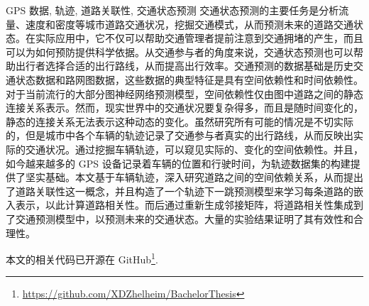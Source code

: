 \begin{中文摘要}{GPS 数据, 轨迹, 道路关联性, 交通状态预测}
  交通状态预测的主要任务是分析流量、速度和密度等城市道路交通状况，挖掘交通模式，从而预测未来的道路交通状态。在实际应用中，它不仅可以帮助交通管理者提前注意到交通拥堵的产生，而且可以为如何预防提供科学依据。从交通参与者的角度来说，交通状态预测也可以帮助出行者选择合适的出行路线，从而提高出行效率。交通预测的数据基础是历史交通状态数据和路网图数据，这些数据的典型特征是具有空间依赖性和时间依赖性。对于当前流行的大部分图神经网络预测模型，空间依赖性仅由图中道路之间的静态连接关系表示。然而，现实世界中的交通状况要复杂得多，而且是随时间变化的，静态的连接关系无法表示这种动态的变化。虽然研究所有可能的情况是不切实际的，但是城市中各个车辆的轨迹记录了交通参与者真实的出行路线，从而反映出实际的交通状况。通过挖掘车辆轨迹，可以窥见实际的、变化的空间依赖性。并且，如今越来越多的 GPS 设备记录着车辆的位置和行驶时间，为轨迹数据集的构建提供了坚实基础。本文基于车辆轨迹，深入研究道路之间的空间依赖关系，从而提出了道路关联性这一概念，并且构造了一个轨迹下一跳预测模型来学习每条道路的嵌入表示，以此计算道路相关性。而后通过重新生成邻接矩阵，将道路相关性集成到了交通预测模型中，以预测未来的交通状态。大量的实验结果证明了其有效性和合理性。

  本文的相关代码已开源在 GitHub\footnote{\href{https://github.com/XDZhelheim/BachelorThesis}{https://github.com/XDZhelheim/BachelorThesis}}.
\end{中文摘要}
